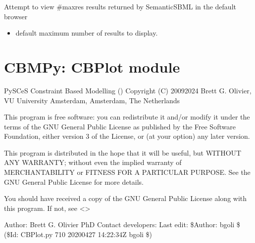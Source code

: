 \documentclass[letterpaper,10pt,english]{sphinxmanual}
\begin{document}
\begin{fulllineitems}
\begin{fulllineitems}
\label{\detokenize{modules_doc:cbmpy.CBNetDB.SemanticSBML.viewDataInWebrowser}}
\pysigstartsignatures
{}
\pysigstopsignatures
\sphinxAtStartPar
Attempt to view \#maxres results returned by SemanticSBML in the default browser
\begin{itemize}
\item {} 
\sphinxAtStartPar
{} default maximum number of results to display.

\end{itemize}

\end{fulllineitems}


\end{fulllineitems}

\label{\detokenize{modules_doc:module-cbmpy.CBPlot}}

\section{CBMPy: CBPlot module}
\label{\detokenize{modules_doc:cbmpy-cbplot-module}}
\sphinxAtStartPar
PySCeS Constraint Based Modelling ()
Copyright (C) 2009\sphinxhyphen{}2024 Brett G. Olivier, VU University Amsterdam, Amsterdam, The Netherlands

\sphinxAtStartPar
This program is free software: you can redistribute it and/or modify
it under the terms of the GNU General Public License as published by
the Free Software Foundation, either version 3 of the License, or
(at your option) any later version.

\sphinxAtStartPar
This program is distributed in the hope that it will be useful,
but WITHOUT ANY WARRANTY; without even the implied warranty of
MERCHANTABILITY or FITNESS FOR A PARTICULAR PURPOSE.  See the
GNU General Public License for more details.

\sphinxAtStartPar
You should have received a copy of the GNU General Public License
along with this program.  If not, see \textless{}\textgreater{}

\sphinxAtStartPar
Author: Brett G. Olivier PhD
Contact developers: 
Last edit: \$Author: bgoli \$ (\$Id: CBPlot.py 710 2020\sphinxhyphen{}04\sphinxhyphen{}27 14:22:34Z bgoli \$)
\end{document}
